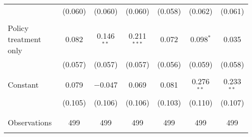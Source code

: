 \begin{tabular}{@{\extracolsep{5pt}}lcccccc}
  & (0.060) & (0.060) & (0.060) & (0.058) & (0.062) & (0.061) \\ 
  & & & & & & \\ 
 Policy treatment only & 0.082 & 0.146$^{**}$ & 0.211$^{***}$ & 0.072 & 0.098$^{*}$ & 0.035 \\ 
  & (0.057) & (0.057) & (0.057) & (0.056) & (0.059) & (0.058) \\ 
  & & & & & & \\ 
 Constant & 0.079 & $-$0.047 & 0.069 & 0.081 & 0.276$^{**}$ & 0.233$^{**}$ \\ 
  & (0.105) & (0.106) & (0.106) & (0.103) & (0.110) & (0.107) \\ 
  & & & & & & \\ 
\hline \\[-1.8ex] 

Observations & 499 & 499 & 499 & 499 & 499 & 499 \\ 
\hline 
\hline \\[-1.8ex] 
\end{tabular} 